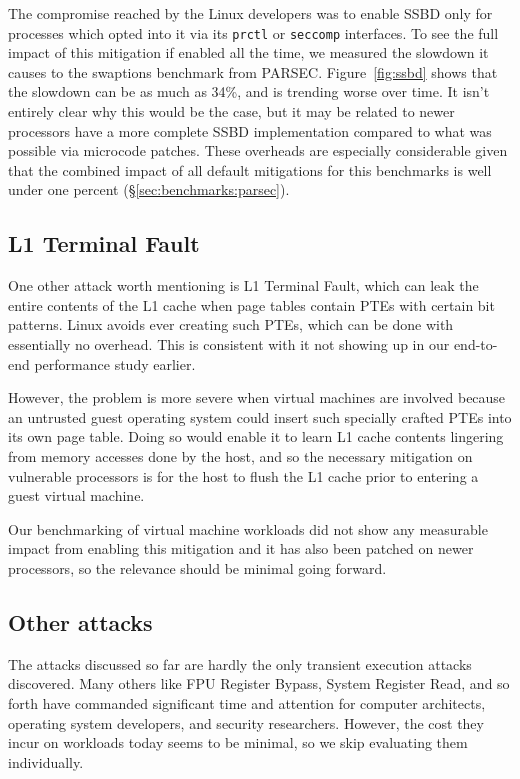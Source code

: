 The compromise reached by the Linux developers was to enable SSBD only for processes which opted into it via its \texttt{prctl} or \texttt{seccomp} interfaces.
To see the full impact of this mitigation if enabled all the time, we measured the slowdown it causes to the swaptions benchmark from PARSEC.
Figure~\ref{fig:ssbd} shows that the slowdown can be as much as 34\%,
and is trending worse over time.
It isn't entirely clear why this would be the case, but it may be related to newer processors have a more complete SSBD implementation compared to what was possible via microcode patches.
These overheads are especially considerable given that the combined
impact of all default mitigations for this benchmarks is well under one percent (\S\ref{sec:benchmarks:parsec}).

\subsection{L1 Terminal Fault}
One other attack worth mentioning is L1 Terminal Fault, which can leak the entire contents of the L1 cache when page tables contain PTEs with certain bit patterns.
Linux avoids ever creating such PTEs, which can be done with essentially no overhead.
This is consistent with it not showing up in our end-to-end performance study earlier.

However, the problem is more severe when virtual machines are involved because an untrusted guest operating system could insert such specially crafted PTEs into its own page table.
Doing so would enable it to learn L1 cache contents lingering from memory accesses done by the host, and so the necessary mitigation on vulnerable processors is for the host to flush the L1 cache prior to entering a guest virtual machine.

Our benchmarking of virtual machine workloads did not show any measurable impact from enabling this mitigation and it has also been patched on newer processors, so the relevance should be minimal going forward.

\subsection{Other attacks}

The attacks discussed so far are hardly the only transient execution attacks discovered.
Many others like FPU Register Bypass, System Register Read, and so forth have commanded significant time and attention for computer architects, operating system developers, and security researchers.
However, the cost they incur on workloads today seems to be minimal, so we skip evaluating them individually.
